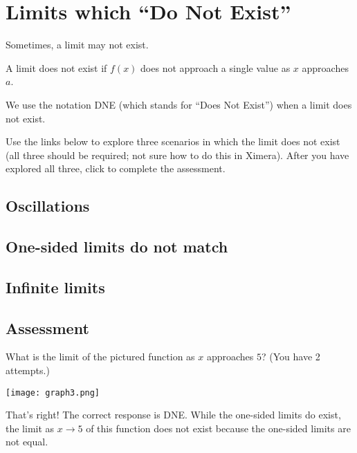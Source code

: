 \documentclass{ximera}
\begin{document}
\section{Limits which ``Do Not Exist''}

Sometimes, a limit may not exist.

\begin{explanation}
    A limit does not exist if $f(x)$ does not approach a single value as $x$ approaches $a$.
\end{explanation}

We use the notation DNE (which stands for ``Does Not Exist'') when a limit does not exist.

Use the links below to explore three scenarios in which the limit does not exist (all three should be required; not sure how to do this in Ximera). After you have explored all three, click to complete the assessment.

\subsection{Oscillations}
\begin{center}
\end{center}
\subsection{One-sided limits do not match}
\begin{center}
\end{center}
\subsection{Infinite limits}
\begin{center}
\end{center}
\subsection{Assessment}
\begin{question}
What is the limit of the pictured function as $x$ approaches $5$? (You have 2 attempts.)

\texttt{[image: graph3.png]}
\begin{multipleChoice}  
\end{multipleChoice}  

\begin{explanation}
    That's right! The correct response is DNE. While the one-sided limits do exist, the limit as $x \to 5$ of this function does not exist because the one-sided limits are not equal.
\end{explanation}
\end{question}
\end{document}
